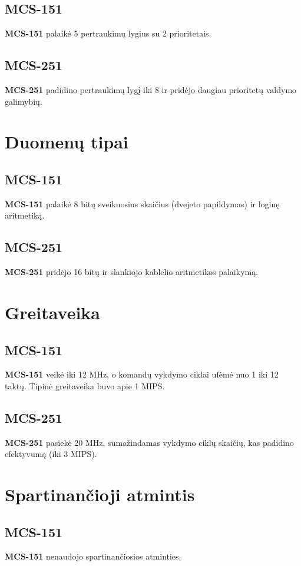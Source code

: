 \documentclass[a4paper,12pt]{article}
\begin{document}
\subsection{MCS-151}
\textbf{MCS-151} palaikė 5 pertraukimų lygius su 2 prioritetais.

\subsection{MCS-251}
\textbf{MCS-251} padidino pertraukimų lygį iki 8 ir pridėjo daugiau prioritetų valdymo galimybių.


 
\section{Duomenų tipai}
\subsection{MCS-151}
\textbf{MCS-151} palaikė 8 bitų sveikuosius skaičius (dvejeto papildymas) ir loginę aritmetiką.

\subsection{MCS-251}
\textbf{MCS-251} pridėjo 16 bitų ir slankiojo kablelio aritmetikos palaikymą.

\newpage
 
\section{Greitaveika}
\subsection{MCS-151}
\textbf{MCS-151} veikė iki 12 MHz, o komandų vykdymo ciklai uſėmė nuo 1 iki 12 taktų. Tipinė greitaveika buvo apie 1 MIPS.

\subsection{MCS-251}
\textbf{MCS-251} pasiekė 20 MHz, sumažindamas vykdymo ciklų skaičių, kas padidino efektyvumą (iki 3 MIPS).


 
\section{Spartinančioji atmintis}
\subsection{MCS-151}
\textbf{MCS-151} nenaudojo spartinančiosios atminties.
\end{document}
